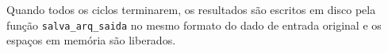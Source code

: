 Quando todos os ciclos terminarem, os resultados são escritos em disco pela função \linebreak \texttt{salva\_arq\_saida} no mesmo formato do dado de entrada original e os espaços em memória são liberados.


